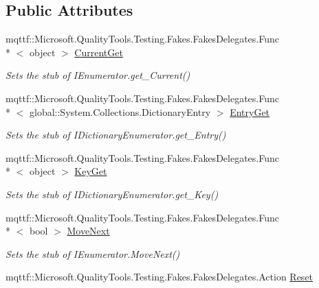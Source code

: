 \subsection*{Public Attributes}
\begin{DoxyCompactItemize}
\item 
mqttf\-::\-Microsoft.\-Quality\-Tools.\-Testing.\-Fakes.\-Fakes\-Delegates.\-Func\\*
$<$ object $>$ \hyperlink{class_system_1_1_collections_1_1_fakes_1_1_stub_i_dictionary_enumerator_a0ceb3db7d248ab463deb356bebe78be4}{Current\-Get}
\begin{DoxyCompactList}\small\item\em Sets the stub of I\-Enumerator.\-get\-\_\-\-Current()\end{DoxyCompactList}\item 
mqttf\-::\-Microsoft.\-Quality\-Tools.\-Testing.\-Fakes.\-Fakes\-Delegates.\-Func\\*
$<$ global\-::\-System.\-Collections.\-Dictionary\-Entry $>$ \hyperlink{class_system_1_1_collections_1_1_fakes_1_1_stub_i_dictionary_enumerator_af5ec64199bf4eefbb2fa56c35224cdfe}{Entry\-Get}
\begin{DoxyCompactList}\small\item\em Sets the stub of I\-Dictionary\-Enumerator.\-get\-\_\-\-Entry()\end{DoxyCompactList}\item 
mqttf\-::\-Microsoft.\-Quality\-Tools.\-Testing.\-Fakes.\-Fakes\-Delegates.\-Func\\*
$<$ object $>$ \hyperlink{class_system_1_1_collections_1_1_fakes_1_1_stub_i_dictionary_enumerator_aac8001a328fea85ddb96bd918ec35941}{Key\-Get}
\begin{DoxyCompactList}\small\item\em Sets the stub of I\-Dictionary\-Enumerator.\-get\-\_\-\-Key()\end{DoxyCompactList}\item 
mqttf\-::\-Microsoft.\-Quality\-Tools.\-Testing.\-Fakes.\-Fakes\-Delegates.\-Func\\*
$<$ bool $>$ \hyperlink{class_system_1_1_collections_1_1_fakes_1_1_stub_i_dictionary_enumerator_a2e58c600e7334eea7414402b95b6230d}{Move\-Next}
\begin{DoxyCompactList}\small\item\em Sets the stub of I\-Enumerator.\-Move\-Next()\end{DoxyCompactList}\item 
mqttf\-::\-Microsoft.\-Quality\-Tools.\-Testing.\-Fakes.\-Fakes\-Delegates.\-Action \hyperlink{class_system_1_1_collections_1_1_fakes_1_1_stub_i_dictionary_enumerator_af55e9af60090567f60e26fbaf990212b}{Reset}

\end{DoxyCompactItemize}
